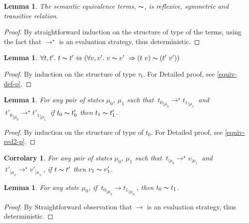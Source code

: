 \documentclass[a4paper,11pt,oneside]{article}
\theoremstyle{plain}
\newtheorem{lemma}[definition]{Lemma}
\newtheorem{corr}[definition]{Corrolary}
\newcommand{\tmapp}[2]{(#1 ~ #2)}
\newcommand{\ty}[1][]{\tau_{#1}}
\newcommand{\evalstep}[4]{~#1_{|\mu_#2} \rightarrow #3_{|\mu_#4} ~}
\newcommand{\evalstar}[4]{~#1_{|\mu_#2} \rightarrow^{\star} #3_{|\mu_#4} ~}
\newcommand{\eqv}[1]{#1 \thicksim #1'}
\begin{document}
	\begin{lemma} 
		The semantic equivalence 	terms, $\thicksim$, is reflexive, 	
		symmetric and transitive relation.
	\end{lemma}
	
	\begin{proof}
		By straightforward induction on the structure of type of the terms, using 
		the fact that $\rightarrow^\star$ is an evaluation strategy, thus 
		deterministic.
	\end{proof}

	\begin{lemma}
		$\forall t,t'.~ \eqv{t} \Leftrightarrow 
			(\forall v, v'.~\eqv{v}~\Rightarrow
			\tmapp{t}{v} \thicksim \tmapp{t'}{v'})$
	\label{equiv-def-l}
	\end{lemma}
	
	\begin{proof} By induction on the structure of type $\ty[t]$.
	For Detailed proof, see \ref{equiv-def-p}.
	\end{proof}

	
	\begin{lemma}
		For any pair of states $\mu_0$, $\mu_1$ such that
		$\evalstar{{t_0}}{0}{{t_1}}{1}$ and $\evalstar{{t'_0}}{0}{{t'_1}}{1}$
		if $\eqv{t_0}$ then $\eqv{t_1}$.
		\label{equiv-red2-l}
	\end{lemma}
	
	\begin{proof}
		By induction on the structure of type of $t_0$. 
		For Detailed proof, see \ref{equiv-red2-p}.
	\end{proof}		

	\begin{corr} 
		For any pair of states $\mu_0$, $\mu_1$ such that
		$\evalstar{{t}}{0}{{v}}{1}$ and \mbox{$\evalstar{{t'}}{0}{{v'}}{1}$},
		if $\eqv{t}$ then $\eqv{v_1}$.
		\label{equivalence parallel preservation corr}
	\end{corr}
	
	
	
	\begin{lemma}
		For any state $\mu_0$, if $\evalstep{{t_0}}{0}{{t_1}}{0}$, then
		$t_0 \thicksim t_1$.
	\end{lemma}	
	\begin{proof}
		By Straightforward observation that $\rightarrow$ is an evaluation
		strategy, thus deterministic.
	\end{proof}		
\end{document}
